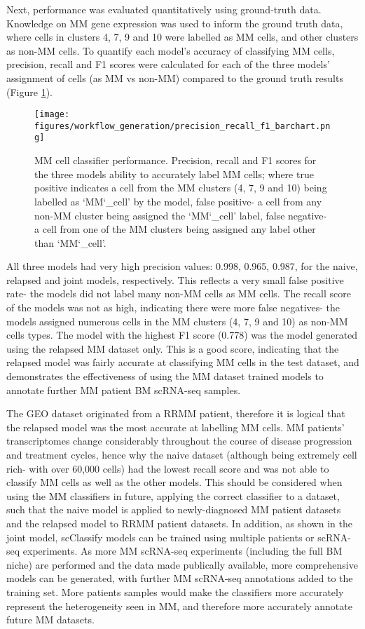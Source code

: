 Next, performance was evaluated quantitatively using ground-truth data.
Knowledge on MM gene expression was used to inform the ground truth data, where cells in clusters 4, 7, 9 and 10 were labelled as MM cells, and other clusters as non-MM cells.
To quantify each model's accuracy of classifying MM cells, precision, recall and F1 scores were calculated for each of the three models' assignment of cells (as MM vs non-MM) compared to the ground truth results (Figure \ref{fig:mm_class_accuracy_bar}).
%
\begin{figure}[htb]
\centering
\texttt{[image: figures/workflow\_generation/precision\_recall\_f1\_barchart.png]}
\caption[MM classifier accuracy]{MM cell classifier performance.
Precision, recall and F1 scores for the three models ability to accurately label MM cells; where true positive indicates a cell from the MM clusters (4, 7, 9 and 10) being labelled as `MM\char`_cell' by the model, false positive- a cell from any non-MM cluster being assigned the `MM\char`_cell' label, false negative- a cell from one of the MM clusters being assigned any label other than `MM\char`_cell'.
}
\label{fig:mm_class_accuracy_bar}
\end{figure}
%
All three models had very high precision values: 0.998, 0.965, 0.987, for the naive, relapsed and joint models, respectively.
This reflects a very small false positive rate- the models did not label many non-MM cells as MM cells.
The recall score of the models was not as high, indicating there were more false negatives- the models assigned numerous cells in the MM clusters (4, 7, 9 and 10) as non-MM cells types.
The model with the highest F1 score (0.778) was the model generated using the relapsed MM dataset only.
This is a good score, indicating that the relapsed model was fairly accurate at classifying MM cells in the test dataset, and demonstrates the effectiveness of using the MM dataset trained models to annotate further MM patient BM scRNA-seq samples.

The GEO dataset originated from a RRMM patient, therefore it is logical that the relapsed model was the most accurate at labelling MM cells.
MM patients' transcriptomes change considerably throughout the course of disease progression and treatment cycles, hence why the naive dataset (although being extremely cell rich- with over 60,000 cells) had the lowest recall score and was not able to classify MM cells as well as the other models.
This should be considered when using the MM classifiers in future, applying the correct classifier to a dataset, such that the naive model is applied to newly-diagnosed MM patient datasets and the relapsed model to RRMM patient datasets.
In addition, as shown in the joint model, scClassify models can be trained using multiple patients or scRNA-seq experiments.
As more MM scRNA-seq experiments (including the full BM niche) are performed and the data made publically available, more comprehensive models can be generated, with further MM scRNA-seq annotations added to the training set.
More patients samples would make the classifiers more accurately represent the heterogeneity seen in MM, and therefore more accurately annotate future MM datasets.



